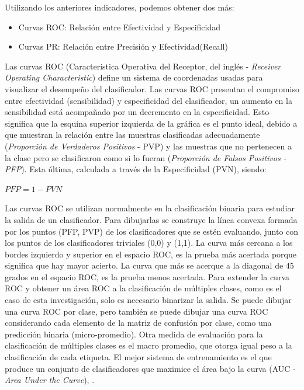 	Utilizando los anteriores indicadores, podemos obtener dos más:
	\begin{itemize}
		\item Curvas ROC: Relación entre Efectividad y Especificidad
		\item Curvas PR: Relación entre Precisión y Efectividad(Recall)
	\end{itemize}

	
	Las curvas ROC (Característica Operativa del Receptor, del inglés - \textit{Receiver Operating Characteristic}) define un sistema de coordenadas usadas para visualizar el desempeño del clasificador. Las curvas ROC presentan el compromiso entre efectividad (sensibilidad) y especificidad del clasificador, un aumento en la sensibilidad está acompañado por un decremento en la especificidad. Esto significa que la esquina superior izquierda de la gráfica es el punto ideal, debido a que muestran la relación entre las muestras clasificadas adecuadamente (\textit{Proporción de Verdaderos Positivos} - PVP) y las muestras que no pertenecen a la clase pero se clasificaron como si lo fueran (\textit{Proporción de Falsos Positivos - PFP}). Esta última, calculada a través de la Especificidad (PVN), siendo:
	\begin{center}
	{$PFP= 1 - PVN$}
	\end{center}

	Las curvas ROC se utilizan normalmente en la clasificación binaria para estudiar la salida de un clasificador. Para dibujarlas se construye la línea convexa formada por los puntos (PFP, PVP) de los clasificadores que se estén evaluando, junto con los puntos de los clasificadores triviales (0,0) y (1,1). La curva más cercana a los bordes izquierdo y superior en el espacio ROC, es la prueba más acertada porque significa que hay mayor acierto. La curva que más se acerque a la diagonal de 45 grados en el espacio ROC, es la prueba menos acertada. Para extender la curva ROC y obtener un área ROC a la clasificación de múltiples clases, como es el caso de esta investigación, solo es necesario binarizar la salida. Se puede dibujar una curva ROC por clase, pero también se puede dibujar una curva ROC considerando cada elemento de la matriz de confusión por clase, como una predicción binaria (micro-promedio). Otra medida de evaluación para la clasificación de múltiples clases es el macro promedio, que otorga igual peso a la clasificación de cada etiqueta. El mejor sistema de entrenamiento es el que produce un conjunto de clasificadores que maximice el área bajo la curva (AUC - \textit{Area Under the Curve}), \citep{SandovalCereza}.


